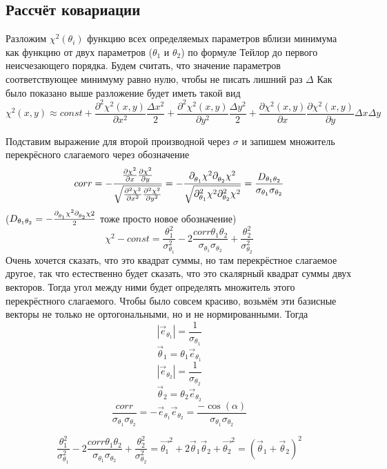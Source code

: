 \documentclass[a4paper,12pt]{article}
\renewcommand{\d}[2][ ]{%
\partial^{#1}_{#2}}
\begin{document}
\subsection{Рассчёт ковариации}

Разложим $\chi^2(\theta_i)$ функцию всех определяемых параметров вблизи минимума
как функцию от двух параметров ($\theta_1$ и $\theta_2$) по формуле Тейлор до первого неисчезающего порядка.
Будем считать, что значение параметров соответствующее минимуму равно нулю, чтобы не писать
лишний раз $\Delta$
Как было показано выше разложение будет иметь такой вид
\[ \chi^2(x, y) \approx const + \frac{\partial^2\chi^2(x, y)}{\partial x^2}\frac{\Delta x^2}{2} +
\frac{\partial^2\chi^2(x, y)}{\partial y^2}\frac{\Delta y^2}{2} + 
\frac{\partial\chi^2(x, y)}{\partial x}\frac{\partial \chi^2(x, y)}{\partial y}\Delta x \Delta y\]

Подставим выражение для второй производной через $\sigma$ и запишем множитель перекрёсного слагаемого через
обозначение 
\[corr = -\frac{\frac{\partial\chi^2}{\partial x}\frac{\partial \chi^2}{\partial y}}{\sqrt{
    \frac{\partial^2\chi^2}{\partial x^2}\frac{\partial^2\chi^2}{\partial y^2}
}} =
-\frac{\d{\theta_1}\chi^2\d{\theta_2}\chi^2}{\sqrt{\d[2]{\theta_1}\chi^2\d[2]{\theta_2}\chi^2}} = \frac{D_{\theta_1\theta_2}}{\sigma_{\theta_1}\sigma_{\theta_2}}\]
($D_{\theta_1\theta_2} = -\frac{\d{\theta_1}\chi^2 \d{\theta_2}\chi 2}{2}$ тоже просто новое обозначение)
\[\chi^2-const =
\frac{\theta_1^2}{\sigma_{\theta_1}^2} - 2 \frac{corr \theta_1 \theta_2}{\sigma_{\theta_1} \sigma_{\theta_2}} + \frac{\theta_2^2}{\sigma_{\theta_2}^2}\]
Очень хочется сказать, что это квадрат суммы, но там перекрёстное слагаемое другое,
так что естественно будет сказать, что это скалярный квадрат суммы двух векторов.
Тогда угол между ними будет определять множитель этого перекрёстного слагаемого.
Чтобы было совсем красиво, возьмём эти базисные векторы не только не ортогональными, но и не нормированными.
Тогда
\[\left\lvert \vec{e}_{\theta_1} \right\rvert = \frac{1}{\sigma_{\theta_1}}\]
\[ \vec{\theta}_1 = \theta_1\vec{e}_{\theta_1} \]
\[\left\lvert \vec{e}_{\theta_2} \right\rvert = \frac{1}{\sigma_{\theta_2}}\]
\[ \vec{\theta}_2 = \theta_2\vec{e}_{\theta_2} \]
\[ \frac{corr}{\sigma_{\theta_1}\sigma_{\theta_2}} = -\vec{e}_{\theta_1}\vec{e}_{\theta_2} = \frac{-\cos(\alpha)}{\sigma_{\theta_1}\sigma_{\theta_2}}\]

\[ \frac{\theta_1^2}{\sigma_{\theta_1}^2} - 2 \frac{corr \theta_1 \theta_2}{\sigma_{\theta_1} \sigma_{\theta_2}} + \frac{\theta_2^2}{\sigma_{\theta_2}^2}
= \vec{\theta_1}^2 + 2\vec{\theta}_1\vec{\theta}_2 + \vec{\theta_2}^2 =
(\vec{\theta}_1 + \vec{\theta}_2)^2 \]
\end{document}
